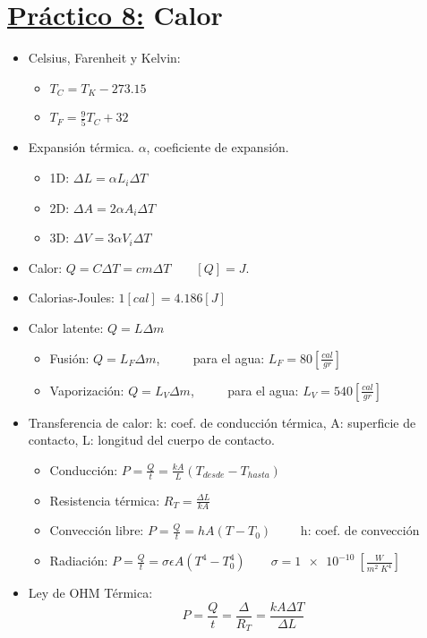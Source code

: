 \documentclass[12pt,a4paper]{article}
\begin{document}
	\section*{\underline{Práctico 8:} Calor}
		\begin{itemize}
			\item Celsius, Farenheit y Kelvin:
				\begin{multicols}{2}
					\begin{itemize}
						\item $T_{C} = T_{K} - 273.15$
						\item $T_{F} = \frac{9}{5} T_{C} + 32$
					\end{itemize}
				\end{multicols}
			\item Expansión térmica. $\alpha$, coeficiente de expansión.
				\begin{multicols}{3}
					\begin{itemize}
						\item 1D: $ \Delta L = \alpha L_{i} \Delta T$
						\item 2D: $ \Delta A = 2\alpha A_{i} \Delta T$
						\item 3D: $ \Delta V = 3\alpha V_{i} \Delta T$
					\end{itemize}
				\end{multicols}
			\item Calor: $Q = C \Delta T = cm \Delta T \qquad [Q] = J$.
			\item Calorias-Joules: $1 [cal] = 4.186 [J]$
			\item Calor latente: $Q = L \Delta m$
				\begin{itemize}
					\item Fusión: $Q = L_{F} \Delta m$, $\qquad$ para el agua: $L_{F} = 80 [\frac{cal}{gr}]$
					\item Vaporización: $Q = L_{V} \Delta m$, $\qquad$ para el agua: $L_{V} = 540 [\frac{cal}{gr}]$
				\end{itemize}
			\item Transferencia de calor: k: coef. de conducción térmica, A: superficie de contacto, L: longitud del cuerpo de
				contacto.
				\begin{itemize}
					\item Conducción: $P = \frac{Q}{t} = \frac{kA}{L} (T_{desde} - T_{hasta})$
					\item Resistencia térmica: $R_{T} = \frac{\Delta L}{kA}$
					\item Convección libre: $P = \frac{Q}{t} = h A (T - T_{0}) \qquad$ h: coef. de convección
					\item Radiación: $P = \frac{Q}{t} = \sigma \epsilon A (T^{4} - T_{0}^{4}) \qquad \sigma = \SI{1e-10}{}
						[\frac{W}{m^{2} \; K^{4}}]$
				\end{itemize}
			\item Ley de OHM Térmica:
				\[
					P = \frac{Q}{t} = \frac{\Delta}{R_{T}} = \frac{kA \Delta T}{\Delta L}
				\]
		\end{itemize}
\end{document}
